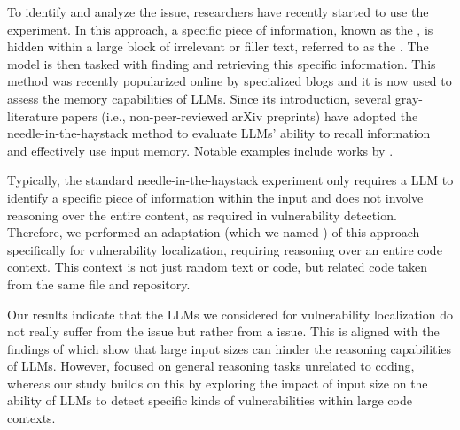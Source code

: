 	To identify and analyze the  issue, researchers have recently started to use the  experiment.
	In this approach, a specific piece of information, known as the , is hidden within a large block of irrelevant or filler text, referred to as the . The model is then tasked with finding and retrieving this specific information.
	This method was recently popularized online by specialized blogs \cite{author2023needle} and it is now used to assess the memory capabilities of \acp{LLM}.
	Since its introduction, several gray-literature papers (i.e., non-peer-reviewed arXiv preprints) have adopted the needle-in-the-haystack method to evaluate LLMs' ability to recall information and effectively use input memory. Notable examples include works by \citet{li2024snapkv,DBLP:journals/corr/abs-2404-08865,liu2024lost,an2024make,xu2023retrieval}.
	
	Typically, the standard needle-in-the-haystack experiment only requires a \ac{LLM} to identify a specific piece of information within the input and does not involve reasoning over the entire content, as required in vulnerability detection.
	Therefore, we performed an adaptation (which we named ) of this approach specifically for vulnerability localization, requiring reasoning over an entire code context. This context is not just random text or code, but related code taken from the same file and repository.
	
	Our results indicate that the \acp{LLM} we considered for vulnerability localization do not really suffer from the  issue but rather from a  issue.
	This is aligned with the findings of \citet{DBLP:journals/corr/abs-2402-14848} which show that large input sizes can hinder the reasoning capabilities of \acp{LLM}.
	However, \citet{DBLP:journals/corr/abs-2402-14848} focused on general reasoning tasks unrelated to coding, whereas our study builds on this by exploring the impact of input size on the ability of \acp{LLM} to detect specific kinds of vulnerabilities within large code contexts.